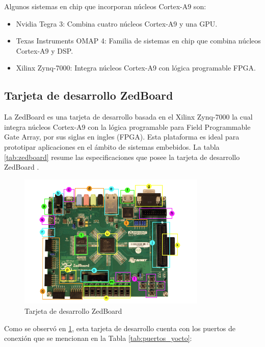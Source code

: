 Algunos sistemas en chip que incorporan núcleos Cortex-A9 son:

\begin{itemize}
    \item Nvidia Tegra 3: Combina cuatro núcleos Cortex-A9 y una GPU.
    \item Texas Instruments OMAP 4: Familia de sistemas en chip que combina núcleos Cortex-A9 y DSP.
    \item Xilinx Zynq-7000: Integra núcleos Cortex-A9 con lógica programable FPGA.
\end{itemize}

\subsection{Tarjeta de desarrollo ZedBoard}

La ZedBoard es una tarjeta de desarrollo basada en el Xilinx Zynq-7000 la cual integra núcleos Cortex-A9 con la lógica programable para Field Programmable Gate Array, por sus siglas en ingles (FPGA). Esta plataforma es ideal para prototipar aplicaciones en el ámbito de sistemas embebidos. La tabla \ref{tab:zedboard} resume las especificaciones que posee la tarjeta de desarrollo ZedBoard \cite{crockett2015zynq}.


\begin{figure}[h!]
    \centering
    \includegraphics[width=0.8\textwidth]{fig/teorico/zedboard_raw.png}
    \caption{Tarjeta de desarrollo ZedBoard}
    \label{fig:zedboard_raw_info}
\end{figure}

Como se observó en \ref{fig:zedboard_raw_info}, esta tarjeta de desarrollo cuenta con los puertos de conexión que se mencionan en la Tabla \ref{tab:puertos_yocto}: 

